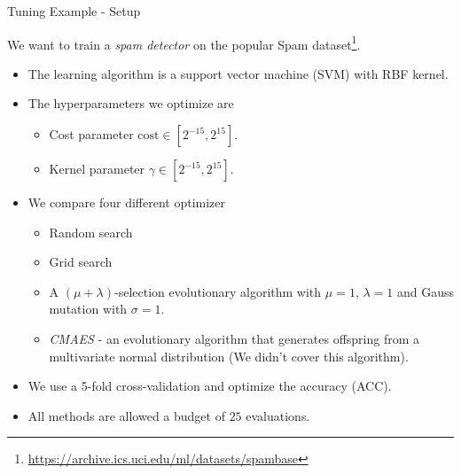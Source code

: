 \begin{frame}{Tuning Example - Setup}

    We want to train a \textit{spam detector} on the popular Spam dataset\footnote{\url{https://archive.ics.uci.edu/ml/datasets/spambase}}.

    \begin{itemize}
        \item The learning algorithm is a support vector machine (SVM) with RBF kernel.
        \item The hyperparameters we optimize are
            \begin{itemize}
                \item Cost parameter $\text{cost} \in [2^{-15}, 2^15]$.
                \item Kernel parameter $\gamma \in [2^{-15}, 2^15]$.
            \end{itemize}
        \item We compare four different optimizer
            \begin{itemize}
                \item Random search
                \item Grid search
                \item A $(\mu+\lambda)$-selection evolutionary algorithm with $\mu = 1$, $\lambda = 1$ and Gauss mutation with $\sigma = 1$.
                \item \textit{CMAES} - an evolutionary algorithm that generates offspring from a multivariate normal distribution (We didn't cover this algorithm).
            \end{itemize}
        \item We use a 5-fold cross-validation and optimize the accuracy (ACC).
        \item All methods are allowed a budget of $25$ evaluations.
    \end{itemize}

\end{frame}


